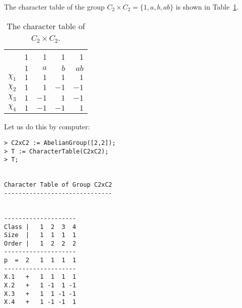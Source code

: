 \begin{example}
	The character table of the group $C_2\times C_2=\{1,a,b,ab\}$ is
    shown in Table~\ref{tab:C2xC2}. 
    
	\begin{table}[ht]
    \caption{The character table of $C_2\times C_2$.}
    \label{tab:C2xC2}
		\begin{tabular}{|c|rrrr|}
			\hline 
			& 1 & 1 & 1 & 1\tabularnewline
			& $1$ & $a$ & $b$ & $ab$\tabularnewline
			\hline 
			$\chi_{1}$ & $1$ & $1$ & $1$ & $1$\tabularnewline
			$\chi_{2}$ & $1$ & $1$ & $-1$ & $-1$\tabularnewline
			$\chi_{3}$ & $1$ & $-1$ & $1$ & $-1$\tabularnewline
			$\chi_{4}$ & $1$ & $-1$ & $-1$ & $1$\tabularnewline
			\hline
		\end{tabular}
	\end{table}
    
	Let us do this by computer:
\begin{lstlisting}
> C2xC2 := AbelianGroup([2,2]);
> T := CharacterTable(C2xC2);
> T;


Character Table of Group C2xC2
------------------------------


--------------------
Class |   1  2  3  4
Size  |   1  1  1  1
Order |   1  2  2  2
--------------------
p  =  2   1  1  1  1
--------------------
X.1   +   1  1  1  1
X.2   +   1 -1  1 -1
X.3   +   1  1 -1 -1
X.4   +   1 -1 -1  1    
\end{lstlisting}



%
%
%               
%               
\end{example}


